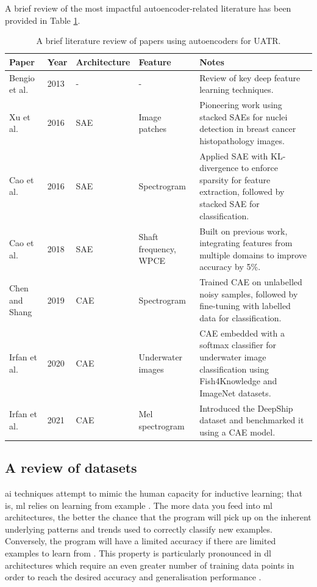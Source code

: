 A brief review of the most impactful autoencoder-related literature has been provided in Table \ref{tab:ae-review}.

\begin{table}
\centering
\caption{A brief literature review of papers using autoencoders for UATR.}
\label{tab:ae-review}
\begin{tabular}{lllp{4cm}p{11cm}}
\toprule
\textbf{Paper} & \textbf{Year} & \textbf{Architecture} & \textbf{Feature} & \textbf{Notes} \\ \midrule
Bengio et al. \cite{bengio_representation_2013} & 2013 & - & - & Review of key deep feature learning techniques. \\
Xu et al. \cite{xu_stacked_2016} & 2016 & SAE & Image patches & Pioneering work using stacked SAEs for nuclei detection in breast cancer histopathology images. \\
Cao et al. \cite{cao_deep_2016} & 2016 & SAE & Spectrogram & Applied SAE with KL-divergence to enforce sparsity for feature extraction, followed by stacked SAE for classification. \\
Cao et al. \cite{cao_convolutional_2019} & 2018 & SAE & Shaft frequency, WPCE & Built on previous work, integrating features from multiple domains to improve accuracy by 5\%. \\
Chen and Shang \cite{chenUnderwaterTargetRecognition2019} & 2019 & CAE & Spectrogram & Trained CAE on unlabelled noisy samples, followed by fine-tuning with labelled data for classification. \\
Irfan et al. \cite{irfan_novel_2021} & 2020 & CAE & Underwater images & CAE embedded with a softmax classifier for underwater image classification using Fish4Knowledge and ImageNet datasets. \\
Irfan et al. \cite{irfan_deepship_2021} & 2021 & CAE & Mel spectrogram & Introduced the DeepShip dataset and benchmarked it using a CAE model. \\ \bottomrule
\end{tabular}
\end{table}

\subsection{A review of datasets}

\acrshort{ai} techniques attempt to mimic the human capacity for inductive learning; that is, \acrlong{ml} relies on learning from example \cite{russell_inductive_1991}. The more data you feed into \acrshort{ml} architectures, the better the chance that the program will pick up on the inherent underlying patterns and trends used to correctly classify new examples. Conversely, the program will have a limited accuracy if there are limited examples to learn from \cite{neupane_review_2020}. This property is particularly pronounced in \acrlong{dl} architectures which require an even greater number of training data points in order to reach the desired accuracy and generalisation performance \cite{schmitt_there_2023}. 

